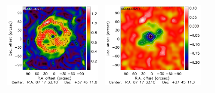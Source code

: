 \documentclass[twocolumn,traditabstract]{aa}
\begin{document}
\begin{figure}[h]
{\begin{tabular}{lll}
\includegraphics[trim=2.3cm 2.2cm 0cm 0cm, clip=true, scale=1]{Figure/Grad_RG448_00211_Ymap_zobs0p4_processed_15_15_45.pdf} & 
\includegraphics[trim=2.3cm 2.2cm 0cm 0cm, clip=true, scale=1]{Figure/DoG_RG448_00211_Ymap_zobs0p4_processed_15_15_45.pdf} \\

\end{tabular}}
\end{figure}
\end{document}
